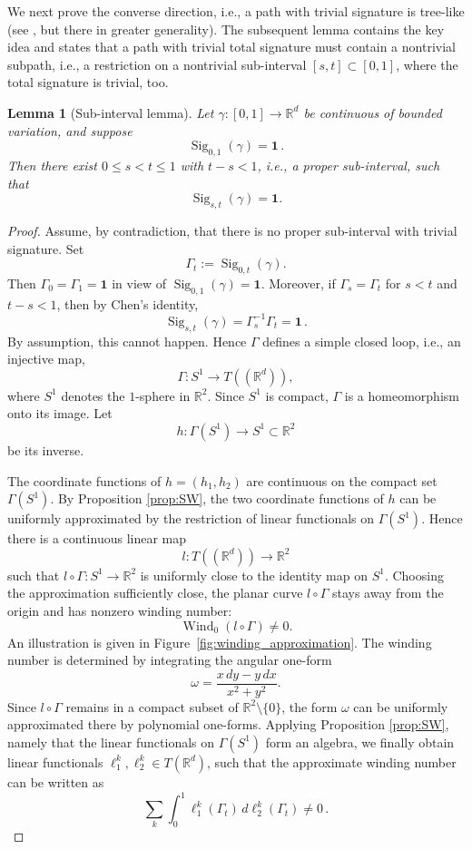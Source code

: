 \documentclass[10pt,a4paper]{amsart}
\newtheorem{lemma}[theorem]{Lemma}
\newcommand{\R}{\mathbb{R}}
\newcommand{\Sig}{\operatorname{Sig}}
\newcommand{\id}{\mathbf{1}}
\newcommand{\wind}{\operatorname{Wind}}
\begin{document}
We next prove the converse direction, i.e., a path with trivial signature is tree-like (see \cite{BGLY2016}, but there in greater generality). The subsequent lemma contains the key idea and states that a path with trivial total signature must contain a nontrivial subpath, i.e., a restriction on a nontrivial sub-interval $[s,t] \subset [0,1]$, where the total signature is trivial, too.

\begin{lemma}[Sub-interval lemma]\label{lem:subinterval}
Let $\gamma:[0,1]\to\R^d$ be continuous of bounded variation, and suppose
\[
  \Sig_{0,1}(\gamma)=\id \, .
\]
Then there exist \(0\leq s<t\leq 1\) with $ t-s < 1$, i.e., a proper sub-interval, such that
\[
  \Sig_{s,t}(\gamma)=\id.
\]
\end{lemma}

\begin{proof}
Assume, by contradiction, that there is no proper sub-interval with trivial signature. Set
\[
  \Gamma_t:=\Sig_{0,t}(\gamma).
\]
Then $\Gamma_0=\Gamma_1 = \id $ in view of  $ \Sig_{0,1}(\gamma)=\id $. Moreover, if $\Gamma_s=\Gamma_t$ for $ s < t$ and $t-s <1$, then by  Chen's identity,
\[
  \Sig_{s,t}(\gamma)=\Gamma_s^{-1}\Gamma_t= \id \, .
\]
By assumption, this cannot happen. Hence $\Gamma$ defines a simple closed loop, i.e., an injective map,
\[
  \Gamma:S^1\to T((\R^d)), 
\]
where $S^1 $ denotes the $1$-sphere in $\R^2$. Since $S^1$ is compact, $\Gamma$ is a homeomorphism onto its image. Let
\[
  h:\Gamma(S^1)\to S^1\subset\R^2
\]
be its inverse.

The coordinate functions of $h=(h_1,h_2)$ are continuous on the compact set $\Gamma(S^1)$. By Proposition \ref{prop:SW}, the two coordinate functions of $h$ can be uniformly approximated 
by the restriction of linear functionals on $\Gamma(S^1)$. Hence there is a continuous linear map
\[
  l:T((\R^d))\to\R^2
\]
such that $l\circ \Gamma: S^1\to \R^2$ 
is uniformly close to the identity map on $S^1$. Choosing the approximation sufficiently close, the planar curve $ l \circ \Gamma $ stays away from the origin and has nonzero winding number:
\[
  \wind_0( l \circ\Gamma)\neq 0.
\]
An illustration is given in Figure~\ref{fig:winding_approximation}. 
The winding number is determined by integrating the angular one-form 
\[
  \omega=\frac{x\,dy-y\,dx}{x^2+y^2}.
\]
Since $ l \circ \Gamma $ remains in a compact subset of $\mathbb{R}^2\setminus\{0\}$, the form $\omega$ can be uniformly approximated there by polynomial one-forms. Applying Proposition \ref{prop:SW}, namely that the linear functionals on $\Gamma(S^1)$ form an algebra, we finally obtain linear functionals $\ell_1^k, \ell_2^k \in T(\mathbb{R}^d)$, such that the approximate winding number can be written as
\[
\sum_k  \int_0^1 \ell_1^k(\Gamma_t) \, d \ell_2^k(\Gamma_t) \neq 0 \, .
\]



\end{proof}
\end{document}
